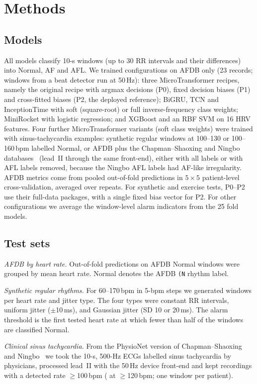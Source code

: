 \documentclass[conference,a4paper]{IEEEtran}
\begin{document}
\section{Methods}
\subsection{Models}
All models classify 10-s windows (up to 30 RR intervals and their differences) into Normal, AF and AFL. We trained \nCfgAfdb{} configurations
on AFDB only (23 records; windows from a beat detector run at 50\,Hz): three MicroTransformer recipes, namely the
original recipe with argmax decisions (P0), fixed decision biases (P1) and cross-fitted biases (P2, the deployed reference); BiGRU,
TCN and InceptionTime with soft (square-root) or full inverse-frequency class weights; MiniRocket with logistic regression; and
XGBoost and an RBF SVM on 16 HRV features. Four further MicroTransformer variants (soft class weights) were trained with
sinus-tachycardia examples: synthetic regular windows at 100--130 or 100--160\,bpm labelled Normal, or AFDB plus the
Chapman--Shaoxing and Ningbo databases~\cite{zheng2020chapman,zheng2020scirep,zheng2022ecgarrhythmia} (lead~II through the same front-end), either with all
labels or with AFL labels removed, because the Ningbo AFL labels had AF-like irregularity. AFDB metrics come from pooled
out-of-fold predictions in $5\times5$ patient-level cross-validation, averaged over repeats. For synthetic and exercise
tests, P0--P2 use their full-data packages, with a single fixed bias vector for P2. For other configurations we average
the window-level alarm indicators from the 25 fold models.

\subsection{Test sets}
\textit{AFDB by heart rate.} Out-of-fold predictions on AFDB Normal windows were grouped by mean heart rate. Normal
denotes the AFDB \texttt{(N} rhythm label.

\textit{Synthetic regular rhythms.} For 60--170\,bpm in 5-bpm steps we generated \nSynth{} windows per heart rate and
jitter type. The four types were constant RR intervals, uniform jitter ($\pm$10\,ms), and Gaussian jitter (SD 10 or
20\,ms). The alarm threshold is the first tested heart rate at which fewer than half of the windows are classified Normal.

\textit{Clinical sinus tachycardia.} From the PhysioNet version of Chapman--Shaoxing and Ningbo~\cite{zheng2022ecgarrhythmia} we
took the 10-s, 500-Hz ECGs labelled sinus tachycardia by physicians, processed lead~II with the 50\,Hz device front-end and kept
\chapNall{} recordings with a detected rate $\geq$100\,bpm (\chapNhi{} at $\geq$120\,bpm; one window per patient).
\end{document}
